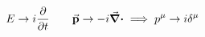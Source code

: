 \begin{equation*}
        E \to i \pdv{t}
        \qquad
        \va{p} \to -i\divergence
        \implies
        p^\mu \to i \delta^\mu
\end{equation*}

